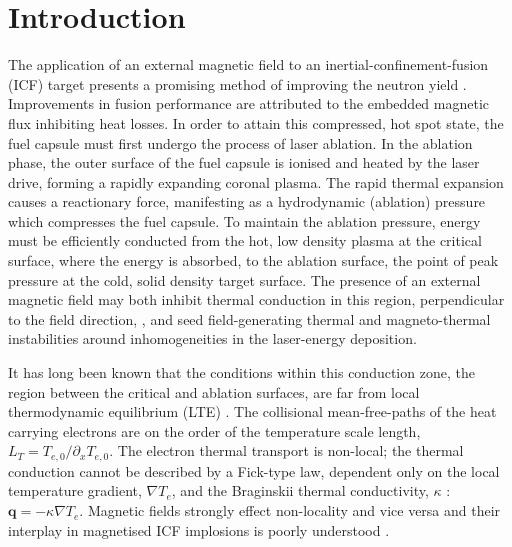 \documentclass[aip,reprint]{revtex4-1}
\begin{document}
\pacs{}%

\maketitle %

\section{Introduction}
The application of an external magnetic field to an  inertial-confinement-fusion (ICF) target presents a promising method of improving the neutron yield \cite{Chang2011}. 
Improvements in fusion performance are attributed to the embedded magnetic flux inhibiting heat losses. In order to attain this compressed, hot spot state, the fuel capsule must first undergo the process of laser ablation. In the ablation phase, the outer surface of the fuel capsule is ionised and heated by the laser drive, forming a rapidly expanding coronal plasma. The rapid thermal expansion causes a reactionary force, manifesting as a hydrodynamic (ablation) pressure which compresses the fuel capsule. To maintain the ablation pressure, energy must be efficiently conducted from the hot, low density plasma at the critical surface, where the energy is absorbed, to the ablation surface, the point of peak pressure at the cold, solid density target surface. The presence of an external magnetic field may both inhibit thermal conduction in this region, perpendicular to the field direction, \cite{Braginskii1965}, and seed field-generating thermal \cite{Fruchtman1992} and magneto-thermal \cite{Bissell2010a} instabilities around inhomogeneities in the laser-energy deposition.

It has long been known that the conditions within this conduction zone, the region between the critical and ablation surfaces, are far from local thermodynamic equilibrium (LTE) \cite{Bell1981}.  The collisional mean-free-paths of the heat carrying electrons are on the order of the temperature scale length, $L_T= T_{e,0}/\partial_x T_{e,0}$. The electron thermal transport is non-local; the thermal conduction cannot be described by a Fick-type law, dependent only on the local temperature gradient, $\nabla T_e$, and the Braginskii thermal conductivity, $\kappa$ \cite{Braginskii1965}: $\mathbf{q} = -\kappa \nabla T_e$. Magnetic fields strongly effect non-locality and vice versa \cite{Brantov2003,Ridgers2008,Hill2018} and their interplay in magnetised ICF implosions is poorly understood \cite{Davies2015}.
\end{document}
